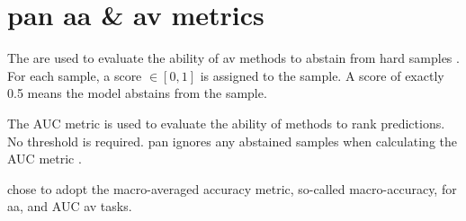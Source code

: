 \section{\ac{pan} \ac{aa} \& \ac{av} metrics}
\label{sec:pan_aa_av_metrics}

The  are used to evaluate the ability of \ac{av} methods 
to abstain from hard samples \cite{tyo_state_2022}.
For each sample, a score $\in [0, 1]$ is assigned to the sample.
A score of exactly 0.5 means the model abstains from the sample.

The AUC metric is used to evaluate the ability of methods to rank predictions.
No threshold is required.
\ac{pan} ignores any abstained samples when calculating the AUC metric \cite{tyo_state_2022}.

\citet{tyo_state_2022} chose to adopt the macro-averaged accuracy metric, so-called macro-accuracy, for \ac{aa}, 
and AUC \ac{av} tasks.
